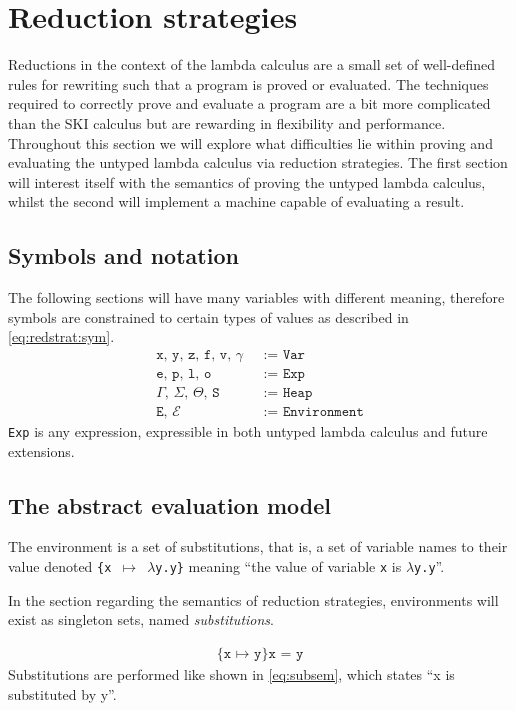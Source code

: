 \section{Reduction strategies}
Reductions in the context of the lambda calculus are a small set of well-defined rules for rewriting such that a program is proved or evaluated.
The techniques required to correctly prove and evaluate a program are a bit more complicated than the SKI calculus but are rewarding in flexibility and performance.
Throughout this section we will explore what difficulties lie within proving and evaluating the untyped lambda calculus via reduction strategies.
The first section will interest itself with the semantics of proving the untyped lambda calculus, whilst the second will implement a machine capable of evaluating a result.

\subsection{Symbols and notation}
The following sections will have many variables with different meaning, therefore symbols are constrained to certain types of values as described in \autoref{eq:redstrat:sym}.
\begin{align}
  \texttt{x, y, z, f, v, $\gamma$ }&\texttt{:= Var}\label{eq:redstrat:sym}\\
  \texttt{e, p, l, o }&\texttt{:= Exp}\tag*{}\\
  \texttt{$\Gamma$, $\Sigma$, $\Theta$, S }&\texttt{:= Heap}\tag*{}\\
  \texttt{E, $\mathcal{E}$ }&\texttt{:= Environment}\tag*{}
\end{align}
\texttt{Exp} is any expression, expressible in both untyped lambda calculus and future extensions.


\subsection{The abstract evaluation model}
The environment is a set of substitutions, that is, a set of variable names to their value denoted \texttt{\{x $\mapsto$ $\lambda$y.y\}} meaning ``the value of variable \texttt{x} is \texttt{$\lambda$y.y}''.
\begin{remark}
  In the section regarding the semantics of reduction strategies, environments will exist as singleton sets, named \textit{substitutions}.
\end{remark}
\begin{align}
  \texttt{\{x $\mapsto$ y\}x = y}\label{eq:subsem}
\end{align}
Substitutions are performed like shown in \autoref{eq:subsem}, which states ``x is substituted by y''.

